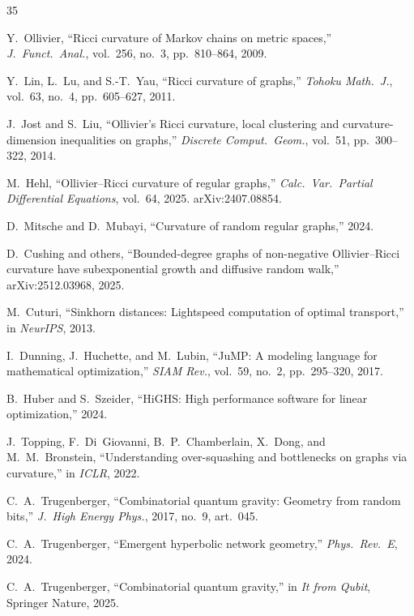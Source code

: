 \documentclass[11pt,a4paper]{article}
\begin{document}

\begin{thebibliography}{35}

Y.~Ollivier, ``Ricci curvature of Markov chains on metric spaces,'' \emph{J.~Funct.~Anal.}, vol.~256, no.~3, pp.~810--864, 2009.

Y.~Lin, L.~Lu, and S.-T.~Yau, ``Ricci curvature of graphs,'' \emph{Tohoku Math.~J.}, vol.~63, no.~4, pp.~605--627, 2011.

J.~Jost and S.~Liu,
``Ollivier's Ricci curvature, local clustering and curvature-dimension inequalities on graphs,''
\emph{Discrete Comput.\ Geom.}, vol.~51, pp.~300--322, 2014.

M.~Hehl, ``Ollivier--Ricci curvature of regular graphs,'' \emph{Calc.~Var.~Partial Differential Equations}, vol.~64, 2025. arXiv:2407.08854.

D.~Mitsche and D.~Mubayi, ``Curvature of random regular graphs,'' 2024.

D.~Cushing and others,
``Bounded-degree graphs of non-negative Ollivier--Ricci curvature have subexponential growth and diffusive random walk,''
arXiv:2512.03968, 2025.

M.~Cuturi, ``Sinkhorn distances: Lightspeed computation of optimal transport,'' in \emph{NeurIPS}, 2013.

I.~Dunning, J.~Huchette, and M.~Lubin, ``JuMP: A modeling language for mathematical optimization,'' \emph{SIAM Rev.}, vol.~59, no.~2, pp.~295--320, 2017.

B.~Huber and S.~Szeider, ``HiGHS: High performance software for linear optimization,'' 2024.

J.~Topping, F.~Di~Giovanni, B.~P.~Chamberlain, X.~Dong, and M.~M.~Bronstein, ``Understanding over-squashing and bottlenecks on graphs via curvature,'' in \emph{ICLR}, 2022.

C.~A.~Trugenberger,
``Combinatorial quantum gravity: Geometry from random bits,''
\emph{J.~High Energy Phys.}, 2017, no.~9, art.~045.

C.~A.~Trugenberger, ``Emergent hyperbolic network geometry,'' \emph{Phys.~Rev.~E}, 2024.

C.~A.~Trugenberger,
``Combinatorial quantum gravity,''
in \emph{It from Qubit}, Springer Nature, 2025.


\end{thebibliography}
\end{document}
